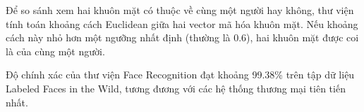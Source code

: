 Để so sánh xem hai khuôn mặt có thuộc về cùng một người hay không, thư viện tính toán khoảng cách Euclidean giữa hai vector mã hóa khuôn mặt. Nếu khoảng cách này nhỏ hơn một ngưỡng nhất định (thường là 0.6), hai khuôn mặt được coi là của cùng một người.

Độ chính xác của thư viện Face Recognition đạt khoảng 99.38\% trên tập dữ liệu Labeled Faces in the Wild, tương đương với các hệ thống thương mại tiên tiến nhất.



    
    


    
